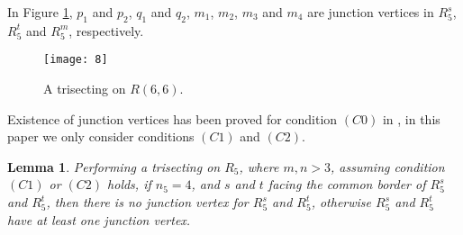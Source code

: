 \documentclass[preprint,12pt]{elsarticle}
\newtheorem{lem}{Lemma}[section]
\begin{document}
In Figure \ref{ca}, $p_1$ and $p_2$, $q_{1}$ and $q_{2}$, $m_{1}$,
$m_{2}$, $m_{3}$ and $m_{4}$ are junction vertices in $R^{s}_5$,
$R^{t}_5$ and $R^{m}_5$, respectively.
\begin{figure}[tb]
  \centering
  \texttt{[image: 8]}
  \caption[]{\small A trisecting on $R(6,6)$.}
  \label{ca}
\end{figure}
Existence of junction vertices has been proved for condition $(C0)$
in \cite{CST:AFAFCHPIM}, in this paper we only consider conditions
$(C1)$ and $(C2)$.
\begin{lem} \label{Lemma:7} Performing a trisecting on $R_{5}$, where $m,n> 3$, assuming condition $(C1)$ or $(C2)$
holds, if $n_5=4$, and $s$ and $t$ facing the common border of
$R^{s}_{5}$ and $R^{t}_{5}$, then there is no junction vertex for
$R^{s}_{5}$ and $R^{t}_{5}$, otherwise $R^{s}_{5}$ and $R^{t}_{5}$
have at least one junction vertex.
\end{lem}
\end{document}
